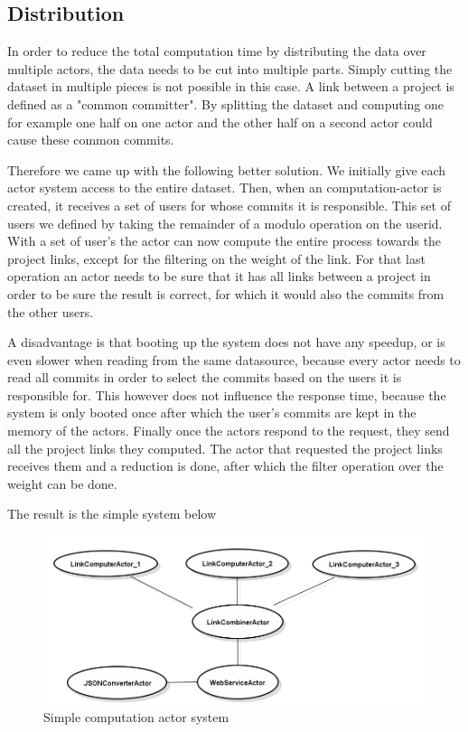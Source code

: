 \documentclass[10pt,a4paper]{article}
\begin{document}
\subsection{Distribution}

In order to reduce the total computation time by distributing the data over multiple actors, the data needs to be cut into multiple parts. Simply cutting the dataset in multiple pieces is not possible in this case. A link between a project is defined as a "common committer". By splitting the dataset and computing one for example one half on one actor and the other half on a second actor could cause these common commits. 

Therefore we came up with the following better solution. We initially give each actor system access to the entire dataset. Then, when an computation-actor is created, it receives a set of users for whose commits it is responsible. This set of users we defined by taking the remainder of a modulo operation on the userid. With a set of user's the actor can now compute the entire process towards the project links, except for the filtering on the weight of the link. For that last operation an actor needs to be sure that it has all links between a project in order to be sure the result is correct, for which it would also the commits from the other users.

A disadvantage is that booting up the system does not have any speedup, or is even slower when reading from the same datasource, because every actor needs to read all commits in order to select the commits based on the users it is responsible for. This however does not influence the response time, because the system is only booted once after which the user's commits are kept in the memory of the actors. Finally once the actors respond to the request, they send all the project links they computed. The actor that requested the project links receives them and a reduction is done, after which the filter operation over the weight can be done.

The result is the simple system below

\begin{figure}[htb]
    \centering
    \includegraphics[width=1.00\textwidth]{ActorSystemSample}
    \caption{Simple computation actor system}
    \label{fig:actor_sample}
\end{figure}
\end{document}
